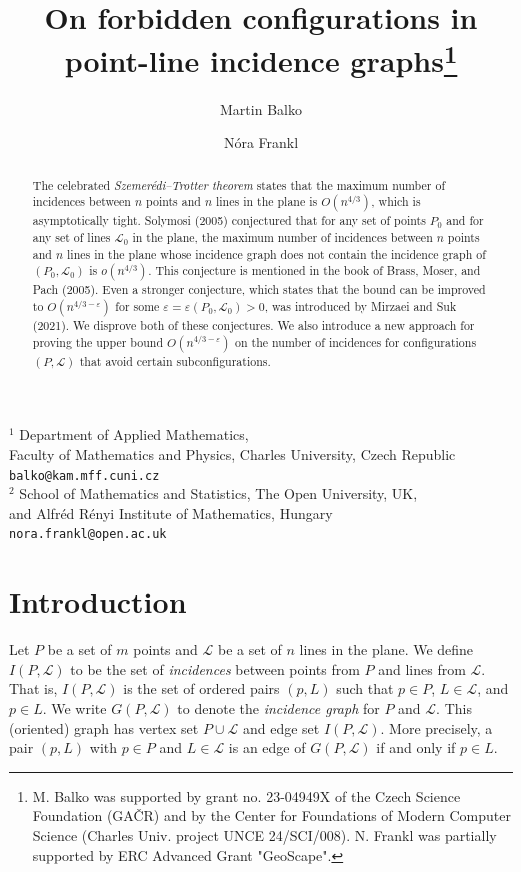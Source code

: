 \documentclass{article}
\title{On forbidden configurations in \\point-line incidence graphs\thanks{M. Balko was supported by grant no. 23-04949X of the Czech Science Foundation (GA\v{C}R) and by the Center for Foundations of Modern Computer Science (Charles Univ. project UNCE 24/SCI/008). N. Frankl was partially supported by ERC Advanced Grant "GeoScape".
} 
}
\author{
Martin Balko\inst{1}
\and
N\'{o}ra Frankl\inst{2}}
\def\inst#1{$^{#1}$}
\begin{document}
\maketitle

\begin{center}
{\footnotesize
\inst{1} 
Department of Applied Mathematics, \\
Faculty of Mathematics and Physics, Charles University, Czech Republic \\
\texttt{balko@kam.mff.cuni.cz}\\
\inst{2} 
School of Mathematics and Statistics, The Open University, UK, \\and Alfr\'{e}d R\'{e}nyi Institute of Mathematics, Hungary \\
\texttt{nora.frankl@open.ac.uk}\\
}
\end{center}

\begin{abstract}
The celebrated \emph{Szemer\'edi--Trotter theorem} states that the maximum number of incidences between $n$ points and $n$ lines in the plane is
$O(n^{4/3})$, which is asymptotically tight.
Solymosi (2005) conjectured that for any set of points $P_0$ and for any set of lines $\mathcal{L}_0$ in the plane, the maximum number of incidences between $n$ points and $n$ lines in the plane whose incidence graph does not contain the incidence graph of $(P_0,\mathcal{L}_0)$ is $o(n^{4/3})$.
This conjecture is mentioned in the book of Brass, Moser, and Pach (2005). Even a stronger conjecture, which states that the bound can be improved to $O(n^{4/3-\varepsilon})$ for some $\varepsilon = \varepsilon(P_0,\mathcal{L}_0)>0$, was introduced by Mirzaei and Suk (2021).
We disprove both of these conjectures.
We also introduce a new approach for proving the upper bound $O(n^{4/3-\varepsilon})$ on the number of incidences for configurations $(P,\mathcal{L})$ that avoid certain subconfigurations.
\end{abstract}

\section{Introduction}


Let $P$ be a set of $m$ points and $\mathcal{L}$ be a set of $n$ lines in the plane.
We define $I(P,\mathcal{L})$ to be the set of \emph{incidences} between points from $P$ and lines from $\mathcal{L}$.
That is, $I(P,\mathcal{L})$ is the set of ordered pairs $(p,L)$ such that $p \in P$, $L \in \mathcal{L}$, and $p \in L$.
We write $G(P,\mathcal{L})$ to denote the \emph{incidence graph} for $P$ and $\mathcal{L}$.
This (oriented) graph has vertex set $P \cup \mathcal{L}$ and edge set $I(P,\mathcal{L})$.
More precisely, a pair $(p,L)$ with $p \in P$ and $L \in \mathcal{L}$ is an edge of $G(P,\mathcal{L})$ if and only if $p \in L$.
\end{document}
